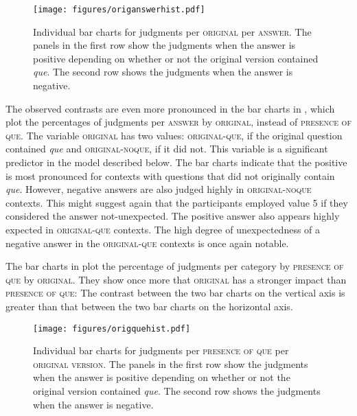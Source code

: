 \begin{figure}[p]
 	\caption{Individual bar charts for judgments per \textsc{original} per \textsc{answer}. The panels in the first row show the judgments when the answer is positive depending on whether or not the original version contained  \emph{que}. The second row shows the judgments when the answer is negative.\label{fig:catorigans}}
 	\texttt{[image: figures/origanswerhist.pdf]}
\end{figure}

The observed contrasts are even more pronounced in the bar charts in , which plot the percentages of  judgments per \textsc{answer} by \textsc{original}, instead of \textsc{presence of que}. The variable \textsc{original} has two values: \textsc{original-que}, if the original question contained \emph{que} and \textsc{original-noque}, if it did not. This variable is a significant predictor in the model described below. The bar charts indicate that the positive  is most pronounced for contexts with questions that did not originally contain \emph{que}. However,  negative answers are also judged highly in \textsc{original-noque} contexts. This might suggest again that the participants employed  value 5 if they considered the answer not-unexpected. The positive answer also appears highly expected in \textsc{original-que} contexts. The high degree of unexpectedness of a negative answer in the \textsc{original-que} contexts is once again notable.

The bar charts in  plot the percentage of judgments per category by  \textsc{presence of que} by \textsc{original}. They show once more that \textsc{original} has a stronger impact than \textsc{presence of que}: The contrast between the two bar charts on the vertical axis is greater than that between the two bar charts on the horizontal axis. 


\begin{figure}[p]
	\texttt{[image: figures/origquehist.pdf]}
		\caption{Individual bar charts for judgments per \textsc{presence of que} per \textsc{original version}. The panels in the first row show the judgments when the answer is positive depending on whether or not the original version contained  \emph{que}. The second row shows the judgments when the answer is negative.\label{fig:catorigque}}
\end{figure}

